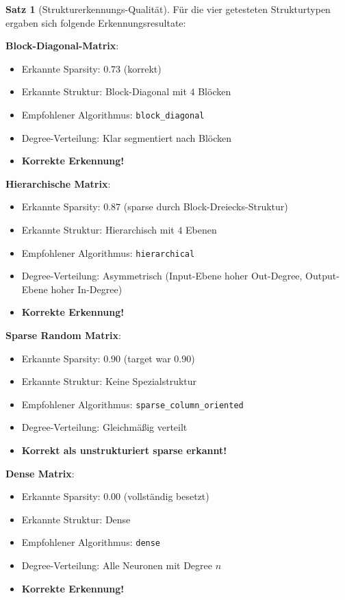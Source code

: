 ﻿\documentclass[a4paper,12pt]{report}
\theoremstyle{definition}
\newtheorem{satz}{Satz}
\begin{document}
	\begin{satz}[Strukturerkennungs-Qualität]
		Für die vier getesteten Strukturtypen ergaben sich folgende Erkennungsresultate:
		
		\textbf{Block-Diagonal-Matrix}:
		\begin{itemize}
			\item Erkannte Sparsity: $0.73$ (korrekt)
			\item Erkannte Struktur: Block-Diagonal mit $4$ Blöcken
			\item Empfohlener Algorithmus: \texttt{block\_diagonal}
			\item Degree-Verteilung: Klar segmentiert nach Blöcken
			\item \textbf{Korrekte Erkennung!}
		\end{itemize}
		
		\textbf{Hierarchische Matrix}:
		\begin{itemize}
			\item Erkannte Sparsity: $0.87$ (sparse durch Block-Dreiecks-Struktur)
			\item Erkannte Struktur: Hierarchisch mit $4$ Ebenen
			\item Empfohlener Algorithmus: \texttt{hierarchical}
			\item Degree-Verteilung: Asymmetrisch (Input-Ebene hoher Out-Degree, Output-Ebene hoher In-Degree)
			\item \textbf{Korrekte Erkennung!}
		\end{itemize}
		
		\textbf{Sparse Random Matrix}:
		\begin{itemize}
			\item Erkannte Sparsity: $0.90$ (target war 0.90)
			\item Erkannte Struktur: Keine Spezialstruktur
			\item Empfohlener Algorithmus: \texttt{sparse\_column\_oriented}
			\item Degree-Verteilung: Gleichmäßig verteilt
			\item \textbf{Korrekt als unstrukturiert sparse erkannt!}
		\end{itemize}
		
		\textbf{Dense Matrix}:
		\begin{itemize}
			\item Erkannte Sparsity: $0.00$ (vollständig besetzt)
			\item Erkannte Struktur: Dense
			\item Empfohlener Algorithmus: \texttt{dense}
			\item Degree-Verteilung: Alle Neuronen mit Degree $n$
			\item \textbf{Korrekte Erkennung!}
		\end{itemize}
	\end{satz}
	
\end{document}
